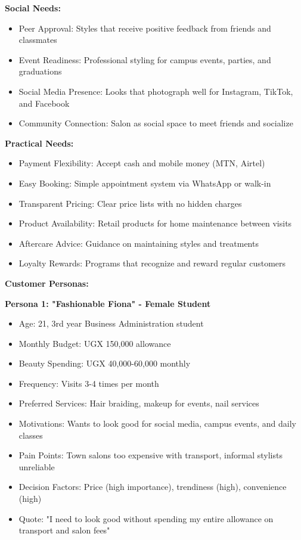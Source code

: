 \documentclass[a4paper,12pt]{article}
\begin{document}
\textbf{Social Needs:}
\begin{itemize}[leftmargin=2em]
    \item Peer Approval: Styles that receive positive feedback from friends and classmates
    \item Event Readiness: Professional styling for campus events, parties, and graduations
    \item Social Media Presence: Looks that photograph well for Instagram, TikTok, and Facebook
    \item Community Connection: Salon as social space to meet friends and socialize
\end{itemize}

\textbf{Practical Needs:}
\begin{itemize}[leftmargin=2em]
    \item Payment Flexibility: Accept cash and mobile money (MTN, Airtel)
    \item Easy Booking: Simple appointment system via WhatsApp or walk-in
    \item Transparent Pricing: Clear price lists with no hidden charges
    \item Product Availability: Retail products for home maintenance between visits
    \item Aftercare Advice: Guidance on maintaining styles and treatments
    \item Loyalty Rewards: Programs that recognize and reward regular customers
\end{itemize}

\vspace{1em}

\textbf{Customer Personas:}

\textbf{Persona 1: "Fashionable Fiona" - Female Student}
\begin{itemize}[leftmargin=2em]
    \item Age: 21, 3rd year Business Administration student
    \item Monthly Budget: UGX 150,000 allowance
    \item Beauty Spending: UGX 40,000-60,000 monthly
    \item Frequency: Visits 3-4 times per month
    \item Preferred Services: Hair braiding, makeup for events, nail services
    \item Motivations: Wants to look good for social media, campus events, and daily classes
    \item Pain Points: Town salons too expensive with transport, informal stylists unreliable
    \item Decision Factors: Price (high importance), trendiness (high), convenience (high)
    \item Quote: "I need to look good without spending my entire allowance on transport and salon fees"
\end{itemize}
\end{document}
